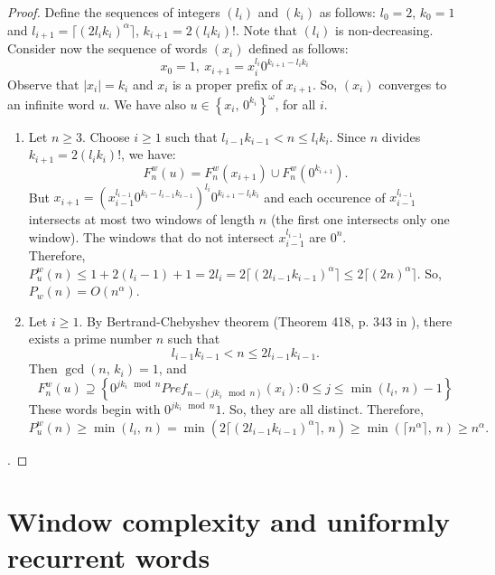 \documentclass[a4 paper,12pt]{article}
\begin{document}
\begin{proof} Define the sequences of integers $(l_i)$ and $(k_i)$ as follows: $l_0=2$, $k_0=1$ and $l_{i+1}=\Big\lceil\left(2l_ik_i\right)^{\alpha}\Big\rceil$, $k_{i+1}=2\left(l_ik_i\right)!$. Note that $(l_i)$ is non-decreasing. \\
Consider now the sequence of words $(x_i)$ defined  as  follows: 
$$x_0=1,\ x_{i+1}=x_{i}^{l_i}0^{k_{i+1}-l_{i}k_{i}}$$
Observe that $|x_i|=k_i$ and $x_i$ is a proper prefix of $x_{i+1}$. So,  $(x_i)$ converges to an infinite word $u$. We have also  $u\in\left\{x_i,\,0^{k_{i}}\right\}^\omega$, for all $i$.

\begin{enumerate}

\item Let $n\geq 3$. Choose $i\geq 1$ such that  $l_{i-1}k_{i-1}<n\leq l_ik_i$. Since $n$ divides $k_{i+1}=2(l_ik_i)!$, we have:
$$F^{w}_{n}(u)=F^{w}_{n}(x_{i+1})\cup F^{w}_{n}(0^{k_{i+1}}).$$
But $x_{i+1}=\left(x_{i-1}^{l_{i-1}}0^{k_{i}-l_{i-1}k_{i-1}}\right)^{l_i}0^{k_{i+1}-l_{i}k_{i}}$ and  each occurence of $x_{i-1}^{l_{i-1}}$ intersects at most two windows %
 of length $n$ (the first one intersects only one window). The windows that do not intersect $x_{i-1}^{l_{i-1}}$ are $0^n$.\\
Therefore, $  P_{u}^{w}(n)\leq  1+2(l_i-1)+1=2l_i=2\Big\lceil \left(2l_{i-1}k_{i-1}\right)^{\alpha}\Big\rceil\leq 2\Big\lceil \left(2n\right)^{\alpha}\Big\rceil$.
So, $P_w(n)=O(n^\alpha)$.

\item Let $i\geq 1$. By Bertrand-Chebyshev theorem (Theorem 418, p. 343 in  \cite{11}), there exists a prime number $n$ such that
$$ l_{i-1}k_{i-1}<n\leq2l_{i-1}k_{i-1}.$$ 
Then $\gcd(n,\, k_i)=1$, and $$F^{w}_{n}(u)\supseteq \left\{0^{jk_i\mod n} Pref_{n-(jk_i\mod n)}\left(x_i\right): 0\leq j\leq \min(l_i,\,n)-1\right\}$$
These words begin with $0^{jk_i\mod n}1$. So, they are all distinct. Therefore, $P^{w}_{u}(n)\geq \min(l_i,\,n)=\min\left(2\Big\lceil \left(2l_{i-1}k_{i-1}\right)^{\alpha}\Big\rceil,\, n\right)\geq \min\left(\Big\lceil n^{\alpha}\Big\rceil,\, n\right)\geq n^{\alpha}.$

\end{enumerate}. \end{proof}



\section{Window complexity and uniformly recurrent words}
\end{document}

